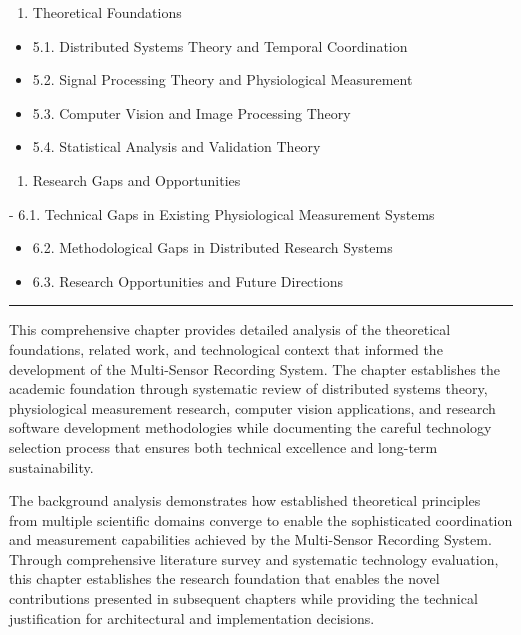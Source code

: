 \documentclass[12pt,a4paper]{report}
\begin{document}
\begin{enumerate}
\item Theoretical Foundations

\end{enumerate}
\begin{itemize}
\item 5.1. Distributed Systems Theory and Temporal Coordination
\item 5.2. Signal Processing Theory and Physiological Measurement
\item 5.3. Computer Vision and Image Processing Theory
\item 5.4. Statistical Analysis and Validation Theory

\end{itemize}
\begin{enumerate}
\item Research Gaps and Opportunities

\end{enumerate}
-
6.1. Technical Gaps in Existing Physiological Measurement Systems
\begin{itemize}
\item 6.2. Methodological Gaps in Distributed Research Systems
\item 6.3. Research Opportunities and Future Directions

\end{itemize}
\hrule

This comprehensive chapter provides detailed analysis of the theoretical foundations, related work, and technological
context that informed the development of the Multi-Sensor Recording System. The chapter establishes the academic
foundation through systematic review of distributed systems theory, physiological measurement research, computer vision
applications, and research software development methodologies while documenting the careful technology selection process
that ensures both technical excellence and long-term sustainability.

The background analysis demonstrates how established theoretical principles from multiple scientific domains converge to
enable the sophisticated coordination and measurement capabilities achieved by the Multi-Sensor Recording System.
Through comprehensive literature survey and systematic technology evaluation, this chapter establishes the research
foundation that enables the novel contributions presented in subsequent chapters while providing the technical
justification for architectural and implementation decisions.
\end{document}
